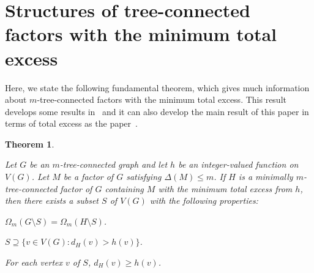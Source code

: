 \documentclass[10pt,bezier]{article}
\newtheorem{prethm}{{\bf Theorem}}[section]
\newenvironment{thm}{\begin{prethm}{\hspace{-0.5
em}{\bf.}}}{\end{prethm}}
\begin{document}
\section{Structures of tree-connected factors with the minimum total excess}
%
Here, we state the following fundamental theorem, which gives much information about $m$-tree-connected factors with the minimum total excess. This result develops some results in~\cite{Ellingham-Nam-Voss-2002, Enomoto-Ohnishi-Ota-2011,ClosedWalks, Win-1989} and it can also develop the main result of this paper in terms of total excess as the paper~\cite{Enomoto-Ohnishi-Ota-2011}.
%
\begin{thm}\label{thm:preliminary:structure}
{Let $G$ be an $m$-tree-connected graph and let $h$ be an integer-valued function on $V(G)$.
Let $M$ be a factor of $G$ satisfying $\Delta(M)\le m$.
 If $H$ is a minimally $m$-tree-connected factor of $G$ containing $M$ with the minimum total excess from $h$, 
then there exists a subset $S$ of $V(G)$ with the following properties:
%
\begin{enumerate}{
\item $\Omega_m(G\setminus S)=\Omega_m(H\setminus S)$.\label{Condition 2.1}
\item $S\supseteq \{v\in V(G):d_H(v)> h(v)\}$.\label{Condition 2.2}
\item For each vertex $v$ of $S$, $d_H(v)\ge h(v)$.\label{Condition 2.3}
}\end{enumerate}
}\end{thm}
\end{document}
